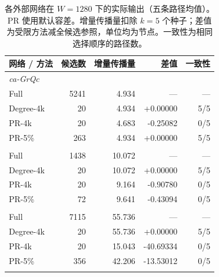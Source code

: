 \begin{table}[htbp]
\caption{各外部网络在 $W=1280$ 下的实际输出（五条路径均值）。PR 使用默认容差。增量传播量扣除 $k=5$ 个种子；差值为受限方法减全候选参照，单位均为节点。一致性为相同选择顺序的路径数。}\label{tab:primary}
\centering\begin{tabular}{lrrrr}\toprule
网络 / 方法 & 候选数 & 增量传播量 & 差值 & 一致性 \\ \midrule
\multicolumn{5}{l}{\textit{ca-GrQc}} \\
Full & 5241 & 4.934 & --- & --- \\
Degree-4k & 20 & 4.934 & +0.00000 & 5/5 \\
PR-4k & 20 & 4.683 & -0.25082 & 0/5 \\
PR-5\% & 263 & 4.934 & +0.00000 & 5/5 \\
\addlinespace
\multicolumn{5}{l}{\textit{CollegeMsg}} \\
Full & 1438 & 10.072 & --- & --- \\
Degree-4k & 20 & 10.072 & +0.00000 & 5/5 \\
PR-4k & 20 & 9.164 & -0.90780 & 0/5 \\
PR-5\% & 72 & 9.641 & -0.43094 & 0/5 \\
\addlinespace
\multicolumn{5}{l}{\textit{wiki-Vote}} \\
Full & 7115 & 55.736 & --- & --- \\
Degree-4k & 20 & 55.736 & +0.00000 & 5/5 \\
PR-4k & 20 & 15.043 & -40.69334 & 0/5 \\
PR-5\% & 356 & 42.206 & -13.53012 & 0/5 \\
\addlinespace
\bottomrule\end{tabular}
\end{table}